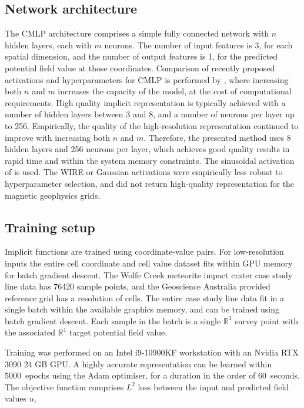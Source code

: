 \subsection{Network architecture}
The CMLP architecture comprises a simple fully connected network with \(n\) hidden layers, each with \(m\) neurons. %
The number of input features is 3, for each spatial dimension, and the number of output features is 1, for the predicted potential field value at those coordinates.
Comparison of recently proposed activations and hyperparameters for CMLP is performed by \textcite{saragadamWIREWaveletImplicit2023}, where increasing both \(n\) and \(m\) increases the capacity of the model, at the cost of computational requirements.
High quality implicit representation is typically achieved with a number of hidden layers between \num{3} and \num{8}, and a number of neurons per layer up to \num{256}.
Empirically, the quality of the high-resolution representation continued to improve with increasing both \(n\) and \(m\).
Therefore, the presented method uses \num{8} hidden layers and \num{256} neurons per layer, which achieves good quality results in rapid time and within the system memory constraints.
The sinusoidal activation of \textcite{sitzmann2019siren} is used.
The WIRE or Gaussian activations were empirically less robust to hyperparameter selection, and did not return high-quality representation for the magnetic geophysics grids.

\subsection{Training setup}
\label{sec:training}

Implicit functions are trained using coordinate-value pairs.
For low-resolution inputs the entire cell coordinate and cell value dataset fits within GPU memory for batch gradient descent.
The Wolfe Creek meteorite impact crater case study line data has \num{76420} sample points, and the Geoscience Australia provided reference grid has a resolution of  cells.
The entire case study line data fit in a single batch within the available graphics memory, and can be trained using batch gradient descent.
Each sample in the batch is a single \(\mathbb{R}^{3}\) survey point with the associated \(\mathbb{R}^{1}\) target potential field value.

Training was performed on an Intel i9-10900KF workstation with an Nvidia RTX 3090 24 GB GPU\@.
A highly accurate representation can be learned within \qty{5000}{epochs} using the Adam optimiser, for a duration in the order of \qty{60}{seconds}.
The objective function comprises \(L^2\) loss between the input and predicted field values \(u\),


